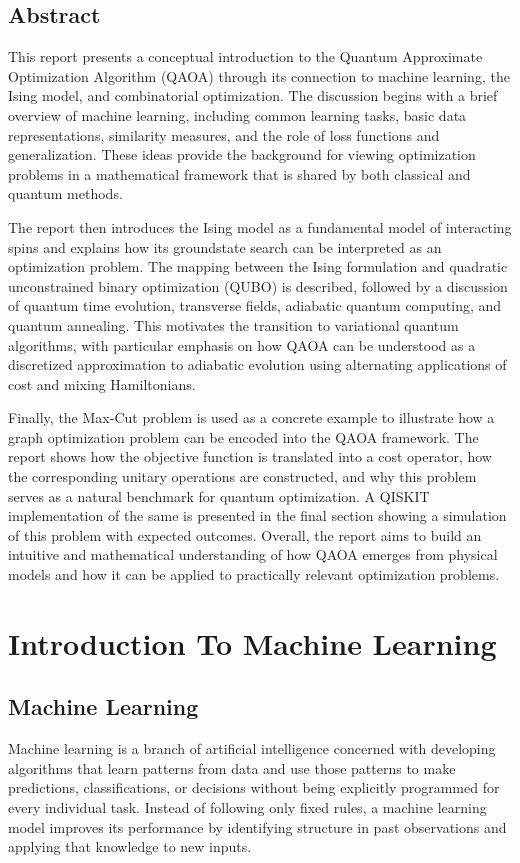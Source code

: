 \documentclass[english,12pt,a4paper]{report}
\begin{document}
	\section*{\centering  \LARGE Abstract}
	This report presents a conceptual introduction to the Quantum Approximate Optimization Algorithm (QAOA) through its connection to machine learning, the Ising model, and combinatorial optimization. The discussion begins with a brief overview of machine learning, including common learning tasks, basic data representations, similarity measures, and the role of loss functions and generalization. These ideas provide the background for viewing optimization problems in a mathematical framework that is shared by both classical and quantum methods.
	
	The report then introduces the Ising model as a fundamental model of interacting spins and explains how its groundstate search can be interpreted as an optimization problem. The mapping between the Ising formulation and quadratic unconstrained binary optimization (QUBO) is described, followed by a discussion of quantum time evolution, transverse fields, adiabatic quantum computing, and quantum annealing. This motivates the transition to variational quantum algorithms, with particular emphasis on how QAOA can be understood as a discretized approximation to adiabatic evolution using alternating applications of cost and mixing Hamiltonians.
	
	Finally, the Max-Cut problem is used as a concrete example to illustrate how a graph optimization problem can be encoded into the QAOA framework. The report shows how the objective function is translated into a cost operator, how the corresponding unitary operations are constructed, and why this problem serves as a natural benchmark for quantum optimization. A QISKIT implementation of the same is presented in the final section showing a simulation of this problem with expected outcomes.
	Overall, the report aims to build an intuitive and mathematical understanding of how QAOA emerges from physical models and how it can be applied to practically relevant optimization problems.
	
	\tableofcontents
	\newpage
	\chapter{Introduction To Machine Learning}
	\section{Machine Learning}
	Machine learning is a branch of artificial intelligence concerned with developing algorithms that learn patterns from data and use those patterns to make predictions, classifications, or decisions without being explicitly programmed for every individual task. Instead of following only fixed rules, a machine learning model improves its performance by identifying structure in past observations and applying that knowledge to new inputs. 
	
\end{document}
